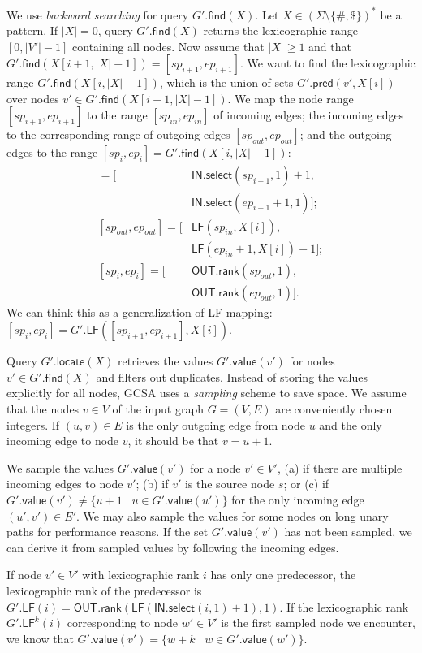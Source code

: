 \documentclass[twoside,leqno,twocolumn]{article}
\newcommand{\set}[1]{\ensuremath{\{ #1 \}}}
\newcommand{\abs}[1]{\ensuremath{\lvert #1 \rvert}}
\newcommand{\rank}{\ensuremath{\mathsf{rank}}}
\newcommand{\select}{\ensuremath{\mathsf{select}}}
\newcommand{\LF}{\ensuremath{\mathsf{LF}}}
\newcommand{\find}{\ensuremath{\mathsf{find}}}
\newcommand{\locate}{\ensuremath{\mathsf{locate}}}
\newcommand{\gpred}{\ensuremath{\mathsf{pred}}}
\newcommand{\gvalue}{\ensuremath{\mathsf{value}}}
\newcommand{\LFmapping}{LF\nobreakdash-mapping}
\newcommand{\patternset}{\ensuremath{(\Sigma \setminus \set{\#, \$})^{\ast}}}
\newcommand{\bvIN}{\ensuremath{\mathsf{IN}}}
\newcommand{\bvOUT}{\ensuremath{\mathsf{OUT}}}
\begin{document}
We use \emph{backward searching} for query $G'.\find(X)$. Let $X \in \patternset$ be a pattern. If $\abs{X} = 0$, query $G'.\find(X)$ returns the lexicographic range $[0, \abs{V'}-1]$ containing all nodes. Now assume that $\abs{X} \ge 1$ and that $G'.\find(X[i+1, \abs{X}-1]) = [sp_{i+1}, ep_{i+1}]$. We want to find the lexicographic range $G'.\find(X[i, \abs{X}-1])$, which is the union of sets $G'.\gpred(v', X[i])$ over nodes $v' \in G'.\find(X[i+1, \abs{X}-1])$. We map the node range $[sp_{i+1}, ep_{i+1}]$ to the range $[sp_{in}, ep_{in}]$ of incoming edges; the incoming edges to the corresponding range of outgoing edges $[sp_{out}, ep_{out}]$; and the outgoing edges to the range $[sp_{i}, ep_{i}] = G'.\find(X[i, \abs{X}-1])$:
\begin{align*}
[sp_{in}, ep_{in}] = [&\bvIN.\select(sp_{i+1}, 1) + 1, \\
 & \bvIN.\select(ep_{i+1}+1, 1)]; \\
[sp_{out}, ep_{out}] = [&\LF(sp_{in}, X[i]), \\
 & \LF(ep_{in}+1, X[i]) - 1]; \\
[sp_{i}, ep_{i}] = [&\bvOUT.\rank(sp_{out}, 1), \\
 & \bvOUT.\rank(ep_{out}, 1)].
\end{align*}
We can think this as a generalization of \LFmapping: $[sp_{i}, ep_{i}] = G'.\LF([sp_{i+1}, ep_{i+1}], X[i])$.

Query $G'.\locate(X)$ retrieves the values $G'.\gvalue(v')$ for nodes $v' \in G'.\find(X)$ and filters out duplicates. Instead of storing the values explicitly for all nodes, GCSA uses a \emph{sampling} scheme to save space. We assume that the nodes $v \in V$ of the input graph $G = (V, E)$ are conveniently chosen integers. If $(u, v) \in E$ is the only outgoing edge from node $u$ and the only incoming edge to node $v$, it should be that $v = u+1$.

We sample the values $G'.\gvalue(v')$ for a node $v' \in V'$, (a) if there are multiple incoming edges to node $v'$; (b) if $v'$ is the source node $s$; or (c) if $G'.\gvalue(v') \ne \set{u+1 \mid u \in G'.\gvalue(u')}$ for the only incoming edge $(u', v') \in E'$. We may also sample the values for some nodes on long unary paths for performance reasons. If the set $G'.\gvalue(v')$ has not been sampled, we can derive it from sampled values by following the incoming edges.

If node $v' \in V'$ with lexicographic rank $i$ has only one predecessor, the lexicographic rank of the predecessor is $G'.\LF(i) = \bvOUT.\rank(\LF(\bvIN.\select(i, 1) + 1), 1)$. If the lexicographic rank $G'.\LF^{k}(i)$ corresponding to node $w' \in V'$ is the first sampled node we encounter, we know that $G'.\gvalue(v') = \set{w+k \mid w \in G'.\gvalue(w')}$.
\end{document}
